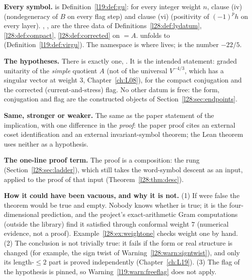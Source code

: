 \begin{dictionary}
\textbf{Every symbol.}  is Definition~\ref{l19:def:gu}: for every integer weight $n$, clause (iv)
(nondegeneracy of $B$ on every flag step) and clause (vi) (positivity of $(-1)^ph$ on every layer). ,
,  are the three data of Definitions~\ref{l28:def:lydatum},
\ref{l28:def:compact}, \ref{l28:def:corrected} on $=A$. 
unfolds to  (Definition~\ref{l19:def:virgu}).
The namespace  is where  lives;  is the number $-22/5$.

\textbf{The hypotheses.} There is exactly one, . It is the intended statement: graded unitarity of the \emph{simple}
quotient $A$ (not of the universal $V^{-4/3}$, which has a singular vector at weight $3$, Chapter~\ref{ch:L08}), for the
compact conjugation and the corrected (current-and-stress) flag. No other datum is free: the form, conjugation and flag are
the constructed objects of Section~\ref{l28:sec:endpoints}.

\textbf{Same, stronger or weaker.} The same as the paper statement of the implication, with one difference in the \emph{proof}: the paper proof cites an
external coset identification and an external invariant-symbol theorem; the Lean theorem uses neither as a hypothesis.

\textbf{The one-line proof term.} The proof is a composition: the rung 
(Section~\ref{l28:sec:ladder}), which still takes the word-symbol descent  as an input, applied to the proof
 of that input (Theorem~\ref{l28:thm:desc}).

\textbf{How it could have been vacuous, and why it is not.} (1) If  were false the theorem would be true and empty.
Nobody knows whether  is true; it is the four-dimensional prediction, and the project's exact-arithmetic Gram
computations (outside the library) find it satisfied through conformal weight $7$
(numerical evidence, not a proof). Example~\ref{l28:ex:weightone} checks weight one by hand. (2) The conclusion is not
trivially true: it fails if the form or real structure is changed (for example, the sign twist of
Warning~\ref{l28:warn:signtwist}), and only its length-$\le2$ part is proved independently (Chapter~\ref{ch:L19}). (3) The
flag of the hypothesis is pinned, so Warning~\ref{l19:warn:freeflag} does not apply.
\end{dictionary}

